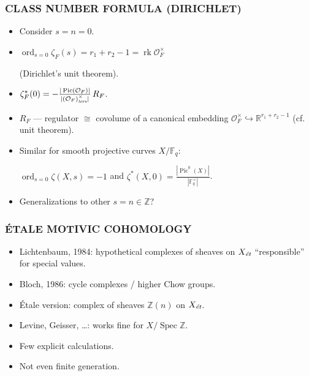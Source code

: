 \documentclass[handout]{beamer}
\newcommand{\FF}{\mathbb{F}}
\newcommand{\RR}{\mathbb{R}}
\newcommand{\ZZ}{\mathbb{Z}}
\DeclareMathOperator{\ord}{ord}
\DeclareMathOperator{\Pic}{Pic}
\DeclareMathOperator{\rk}{rk}
\DeclareMathOperator{\Spec}{Spec}
\newcommand{\et}{\text{\it ét}}
\newcommand{\tors}{\text{\it tors}}
\begin{document}
\begin{frame}
  \frametitle{CLASS NUMBER FORMULA (DIRICHLET)}

  \begin{itemize}
  \item<2-> Consider $s = n = 0$.

  \item<3->
    $\ord_{s = 0} \zeta_F (s) = r_1 + r_2 - 1 = \rk \mathcal{O}_F^\times$

    (Dirichlet's unit theorem).

  \item<4-> $\zeta_F^* (0) = -\frac{|\Pic (\mathcal{O}_F)|}{|(\mathcal{O}_F)^\times_\tors|}\,R_F$.

  \item<5-> $R_F$ --- regulator $\cong$ covolume of a canonical embedding
    $\mathcal{O}_F^\times \hookrightarrow \RR^{r_1 + r_2 - 1}$
    (cf. unit theorem).

  \item<6-> Similar for smooth projective curves $X/\FF_q$:

    $\ord_{s = 0} \zeta (X,s) = -1$ and
    $\zeta^* (X,0) = \frac{|\Pic^0 (X)|}{|\FF_q^\times|}$.

  \item<7-> Generalizations to other $s = n \in \ZZ$?
  \end{itemize}
\end{frame}


\begin{frame}
  \frametitle{ÉTALE MOTIVIC COHOMOLOGY}

  \begin{itemize}
  \item<2-> Lichtenbaum, 1984: hypothetical complexes of sheaves on $X_\et$
    ``responsible'' for special values.

  \item<3-> Bloch, 1986: cycle complexes / higher Chow groups.

  \item<4-> Étale version: complex of sheaves $\ZZ (n)$ on $X_\et$.

  \item<5-> Levine, Geisser, \ldots: works fine for $X / \Spec \ZZ$.

  \item<6-> Few explicit calculations.

  \item<7-> Not even finite generation.
  \end{itemize}
\end{frame}
\end{document}
